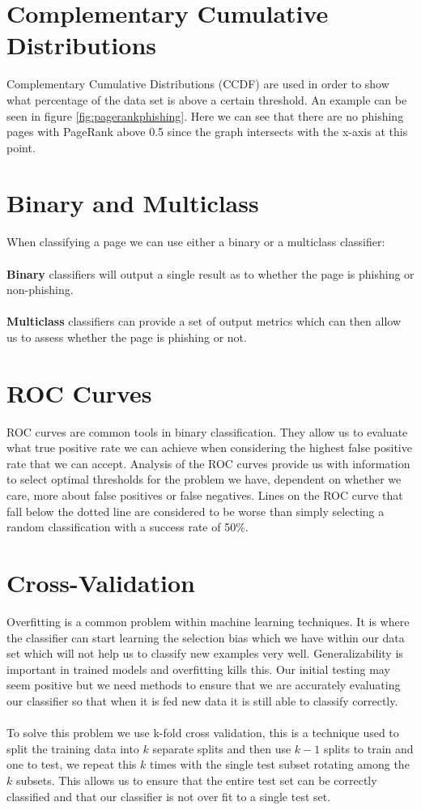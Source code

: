 \documentclass[12pt,twoside]{report}
\begin{document}
\section{Complementary Cumulative Distributions}
Complementary Cumulative Distributions (CCDF) are used in order to show what percentage of the data set is above a certain threshold. An example can be seen in figure \ref{fig:pagerankphishing}. Here we can see that there are no phishing pages with PageRank above 0.5 since the graph intersects with the x-axis at this point.
\section{Binary and Multiclass}
When classifying a page we can use either a binary or a multiclass classifier:
\\\\
\textbf{Binary} classifiers will output a single result as to whether the page is phishing or non-phishing.
\\\\
\textbf{Multiclass} classifiers can provide a set of output metrics which can then allow us to assess whether the page is phishing or not.
\section{ROC Curves}
ROC curves are common tools in binary classification. They allow us to evaluate what true positive rate we can achieve when considering the highest false positive rate that we can accept. Analysis of the ROC curves provide us with information to select optimal thresholds for the problem we have, dependent on whether we care, more about false positives or false negatives. Lines on the ROC curve that fall below the dotted line are considered to be worse than simply selecting a random classification with a success rate of 50\%.

\section{Cross-Validation}
Overfitting is a common problem within machine learning techniques. It is where the classifier can start learning the selection bias which we have within our data set which will not help us to classify new examples very well. Generalizability is important in trained models and overfitting kills this. Our initial testing may seem positive but we need methods to ensure that we are accurately evaluating our classifier so that when it is fed new data it is still able to classify correctly.
\\\\
To solve this problem we use k-fold cross validation, this is a technique used to split the training data into $k$ separate splits and then use $k-1$ splits to train and one to test, we repeat this $k$ times with the single test subset rotating among the $k$ subsets. This allows us to ensure that the entire test set can be correctly classified and that our classifier is not over fit to a single test set.
\newpage
\end{document}
